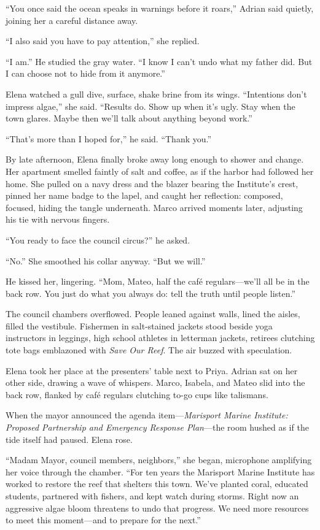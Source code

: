 “You once said the ocean speaks in warnings before it roars,” Adrian said quietly, joining her a careful distance away.

“I also said you have to pay attention,” she replied.

“I am.” He studied the gray water. “I know I can’t undo what my father did. But I can choose not to hide from it anymore.”

Elena watched a gull dive, surface, shake brine from its wings. “Intentions don’t impress algae,” she said. “Results do. Show up when it’s ugly. Stay when the town glares. Maybe then we’ll talk about anything beyond work.”

“That’s more than I hoped for,” he said. “Thank you.”

By late afternoon, Elena finally broke away long enough to shower and change. Her apartment smelled faintly of salt and coffee, as if the harbor had followed her home. She pulled on a navy dress and the blazer bearing the Institute’s crest, pinned her name badge to the lapel, and caught her reflection: composed, focused, hiding the tangle underneath. Marco arrived moments later, adjusting his tie with nervous fingers.

“You ready to face the council circus?” he asked.

“No.” She smoothed his collar anyway. “But we will.”

He kissed her, lingering. “Mom, Mateo, half the café regulars—we’ll all be in the back row. You just do what you always do: tell the truth until people listen.”

The council chambers overflowed. People leaned against walls, lined the aisles, filled the vestibule. Fishermen in salt-stained jackets stood beside yoga instructors in leggings, high school athletes in letterman jackets, retirees clutching tote bags emblazoned with \textit{Save Our Reef}. The air buzzed with speculation.

Elena took her place at the presenters’ table next to Priya. Adrian sat on her other side, drawing a wave of whispers. Marco, Isabela, and Mateo slid into the back row, flanked by café regulars clutching to-go cups like talismans.

When the mayor announced the agenda item—\textit{Marisport Marine Institute: Proposed Partnership and Emergency Response Plan}—the room hushed as if the tide itself had paused. Elena rose.

“Madam Mayor, council members, neighbors,” she began, microphone amplifying her voice through the chamber. “For ten years the Marisport Marine Institute has worked to restore the reef that shelters this town. We’ve planted coral, educated students, partnered with fishers, and kept watch during storms. Right now an aggressive algae bloom threatens to undo that progress. We need more resources to meet this moment—and to prepare for the next.”

